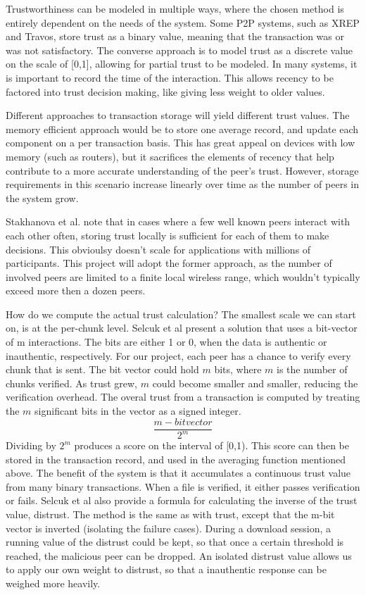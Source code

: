\documentclass[12pt]{article}
\begin{document}
			Trustworthiness can be modeled in multiple ways, where the chosen method is entirely dependent on the needs of the system. Some P2P systems, such as XREP and Travos, store trust as a binary value, meaning that the transaction was or was not satisfactory\cite{damiani2002reputation}. The converse approach is to model trust as a discrete value on the scale of [0,1], allowing for partial trust to be modeled\cite{stakhanova2004reputation}. In many systems, it is important to record the time of the interaction. This allows recency to be factored into trust decision making, like giving less weight to older values.

			Different approaches to transaction storage will yield different trust values. The memory efficient approach would be to store one average record, and update each component on a per transaction basis. This has great appeal on devices with low memory (such as routers), but it sacrifices the elements of recency that help contribute to a more accurate understanding of the peer's trust. However, storage requirements in this scenario increase linearly over time as the number of peers in the system grow.

			Stakhanova et al. note that in cases where a few well known peers interact with each other often, storing trust locally is sufficient for each of them to make decisions. This obvioulsy doesn't scale for applications with millions of participants. This project will adopt the former approach, as the number of involved peers are limited to a finite local wireless range, which wouldn't typically exceed more then a dozen peers\cite{stakhanova2004reputation}.

			How do we compute the actual trust calculation? The smallest scale we can start on, is at the per-chunk level. Selcuk et al present a solution that uses a bit-vector of m interactions. The bits are either 1 or 0, when the data is authentic or inauthentic, respectively. For our project, each peer has a chance to verify every chunk that is sent. The bit vector could hold $m$ bits, where $m$ is the number of chunks verified. As trust grew, $m$ could become smaller and smaller, reducing the verification overhead. The overal trust from a transaction is computed by treating the $m$ significant bits in the vector as a signed integer\cite{stakhanova2004reputation}.
				$$
						\frac{m-bit vector}{2^m}
				$$
			Dividing by $2^m$ produces a score on the interval of [0,1). This score can then be stored in the transaction record, and used in the averaging function mentioned above. The benefit of the system is that it accumulates a continuous trust value from many binary transactions. When a file is verified, it either passes verification or fails. Selcuk et al also provide a formula for calculating the inverse of the trust value, distrust\cite{selcuk2004reputation}. The method is the same as with trust, except that the m-bit vector is inverted (isolating the failure cases). During a download session, a running value of the distrust could be kept, so that once a certain threshold is reached, the malicious peer can be dropped. An isolated distrust value allows us to apply our own weight to distrust, so that a inauthentic response can be weighed more heavily. 
\end{document}
